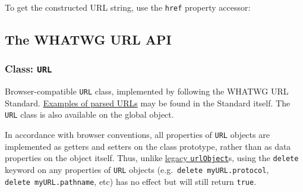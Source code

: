 \begin{Shaded}
\begin{Highlighting}[]
\OperatorTok{=} \OperatorTok{;}
\OperatorTok{=} \OperatorTok{;}
\OperatorTok{=} \OperatorTok{;}
\OperatorTok{=}  \NormalTok{(}\SpecialCharTok{$\{}\SpecialCharTok{\}$\{}\SpecialCharTok{\}$\{}\SpecialCharTok{\}}\VerbatimStringTok{\textasciigrave{}}\NormalTok{)}\OperatorTok{;}
\end{Highlighting}
\end{Shaded}

To get the constructed URL string, use the \texttt{href} property
accessor:

\begin{Shaded}
\begin{Highlighting}[]
\NormalTok{)}\OperatorTok{;}
\end{Highlighting}
\end{Shaded}

\subsection{The WHATWG URL API}\label{the-whatwg-url-api}

\subsubsection{\texorpdfstring{Class:
\texttt{URL}}{Class: URL}}\label{class-url}

Browser-compatible \texttt{URL} class, implemented by following the
WHATWG URL Standard.
\href{https://url.spec.whatwg.org/\#example-url-parsing}{Examples of
parsed URLs} may be found in the Standard itself. The \texttt{URL} class
is also available on the global object.

In accordance with browser conventions, all properties of \texttt{URL}
objects are implemented as getters and setters on the class prototype,
rather than as data properties on the object itself. Thus, unlike
\hyperref[legacy-urlobject]{legacy \texttt{urlObject}}s, using the
\texttt{delete} keyword on any properties of \texttt{URL} objects
(e.g.~\texttt{delete\ myURL.protocol}, \texttt{delete\ myURL.pathname},
etc) has no effect but will still return \texttt{true}.

